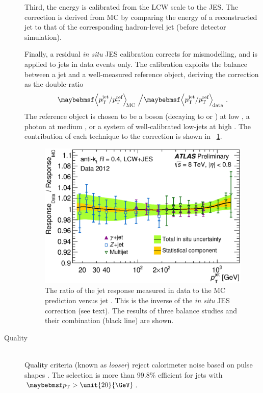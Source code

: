 \begin{description}
	Third, the energy is calibrated from the LCW scale to the JES. The correction is 
	derived from MC by comparing the energy of a reconstructed jet to that of the 
	corresponding hadron-level jet (\ie before detector simulation).

	Finally, a residual \textit{in situ} JES calibration corrects for mismodelling, 
	and is applied to jets in data events only. The calibration exploits the \pt 
	balance between a jet and a well-measured reference object, deriving the correction 
	as the double-ratio
	\begin{equation}
		\angles{p_{\text{T}}^{\text{jet}} / p_{\text{T}}^{\text{ref}}}_{\text{\!MC}} 
		\,\, \Big/ 
		\angles{p_{\text{T}}^{\text{jet}} / p_{\text{T}}^{\text{ref}}}_{\text{\!data}} 
		\,\,.
	\end{equation}
	The reference object is chosen to be a \PZ boson (decaying to \epluseminus or 
	\HepProcess{\APmuon\Pmuon}) at low \pt, a photon at medium \pt, or a system of 
	well-calibrated low-\pt jets at high \pt. The contribution of each technique to 
	the correction is shown in \Figure~\ref{fig:objects:jet_insitu}.

	\begin{figure}[t]
		\includegraphics[width=\mediumfigwidth]{tex/selection/jet_insitu_corr}
		\caption{The ratio of the jet response measured in data to the MC prediction 
		versus jet \pt \cite{Jets:JES:2012}. This is the inverse of the \textit{in situ} 
		JES correction (see text). The results of three \pt balance studies and their 
		combination (black line) are shown.}
		\label{fig:objects:jet_insitu}
	\end{figure}

\item[Quality] \hfill \\
	Quality criteria (known as \textit{looser}) reject calorimeter noise based on 
	pulse shapes \cite{Jets:Quality:2011}. The selection is more than 99.8\% efficient 
	for jets with $\pt > \unit{20}{\GeV}$.


\end{description}
